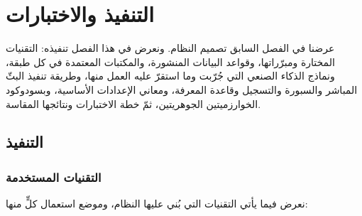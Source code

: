 \chapter{التنفيذ والاختبارات}

\begin{chaptersummary}
عرضنا في الفصل السابق تصميم النظام. ونعرض في هذا الفصل تنفيذه: التقنيات المختارة ومبرّراتها، وقواعد البيانات المنشورة، والمكتبات المعتمدة في كل طبقة، ونماذج الذكاء الصنعي التي جُرّبت وما استقرّ عليه العمل منها، وطريقة تنفيذ البثّ المباشر والسبورة والتسجيل وقاعدة المعرفة، ومعاني الإعدادات الأساسية، وبسودوكود الخوارزميتين الجوهريتين، ثمّ خطة الاختبارات ونتائجها المقاسة.
\end{chaptersummary}

\section{التنفيذ}

\subsection{التقنيات المستخدمة}

نعرض فيما يأتي التقنيات التي بُني عليها النظام، وموضع استعمال كلٍّ منها:

